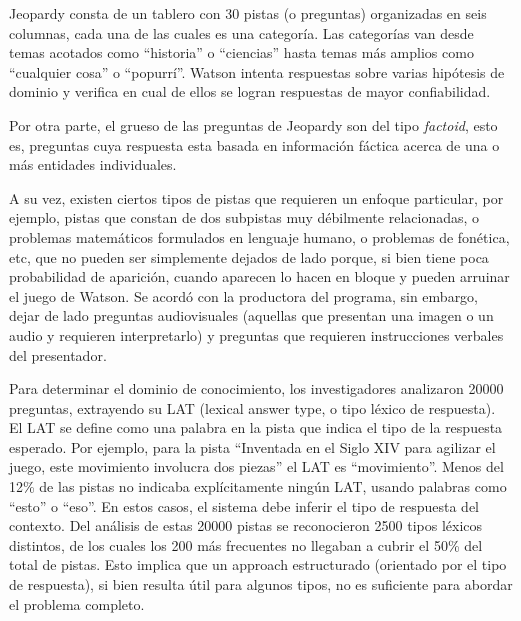 Jeopardy consta de un tablero con 30 pistas (o preguntas) organizadas
en seis columnas, cada una de las cuales es una categoría. Las
categorías van desde temas acotados como
{\textquotedblleft}historia{\textquotedblright} o
{\textquotedblleft}ciencias{\textquotedblright} hasta temas más
amplios como {\textquotedblleft}cualquier cosa{\textquotedblright} o
{\textquotedblleft}popurrí{\textquotedblright}. Watson intenta
respuestas sobre varias hipótesis de dominio y verifica en cual de
ellos se logran respuestas de mayor confiabilidad.

Por otra parte, el grueso de las preguntas de Jeopardy son del tipo
\textit{factoid}, esto es, preguntas cuya respuesta esta basada en
información fáctica acerca de una o más entidades individuales.

A su vez, existen ciertos tipos de pistas que requieren un enfoque
particular, por ejemplo, pistas que constan de dos subpistas muy
débilmente relacionadas, o problemas matemáticos formulados en
lenguaje humano, o problemas de fonética, etc, que no pueden ser
simplemente dejados de lado porque, si bien tiene poca probabilidad de
aparición, cuando aparecen lo hacen en bloque y pueden arruinar el
juego de Watson. Se acordó con la productora del programa, sin
embargo, dejar de lado preguntas audiovisuales (aquellas que presentan
una imagen o un audio y requieren interpretarlo) y preguntas que
requieren instrucciones verbales del presentador.


\bigskip

Para determinar el dominio de conocimiento, los investigadores analizaron 20000 preguntas, extrayendo su LAT (lexical answer type, o tipo léxico de respuesta). El LAT se define como una palabra en la
pista que indica el tipo de la respuesta esperado. Por ejemplo, para la pista {\textquotedblleft}Inventada en el Siglo XIV para agilizar el juego, este movimiento involucra dos piezas{\textquotedblright} el LAT es {\textquotedblleft}movimiento{\textquotedblright}. Menos del 12\% de las pistas no indicaba explícitamente ningún LAT, usando palabras
como {\textquotedblleft}esto{\textquotedblright} o {\textquotedblleft}eso{\textquotedblright}. En estos casos, el sistema debe inferir el tipo de respuesta del contexto. Del análisis de estas
20000 pistas se reconocieron 2500 tipos léxicos distintos, de los cuales los 200 más frecuentes no llegaban a cubrir el 50\% del total de pistas. Esto implica que un approach estructurado (orientado por el
tipo de respuesta), si bien resulta útil para algunos tipos, no es suficiente para abordar el problema completo.

